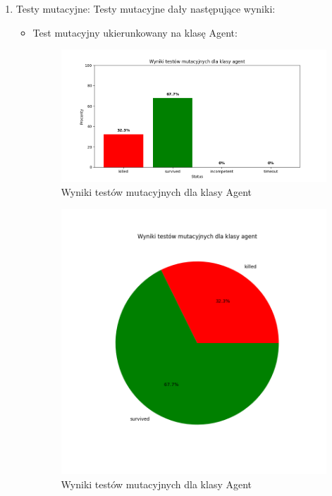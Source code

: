 \documentclass[12pt,a4paper]{article}
\begin{document}
\begin{enumerate}
    \item Testy mutacyjne:
        Testy mutacyjne dały następujące wyniki:
            \begin{itemize}
                \item Test mutacyjny ukierunkowany na klasę Agent:
                    \begin{figure}[H]
                        \centering
                        \includegraphics[width=0.8\linewidth]{media/wykresy/bar_agent_mutual_test.png}
                        \caption{Wyniki testów mutacyjnych dla klasy Agent}
                        \label{fig:enter-label}
                    \end{figure}
                    \begin{figure}[H]
                        \centering
                        \includegraphics[width=0.8\linewidth]{media/wykresy/pie_agent_mutual_test.png}
                        \caption{Wyniki testów mutacyjnych dla klasy Agent}
                        \label{fig:enter-label}
                    \end{figure}


\end{itemize}
\end{enumerate}
\end{document}
